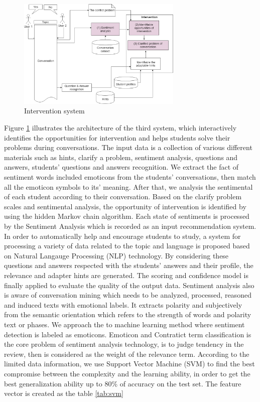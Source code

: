 \documentclass[letterpaper%
, twoside%
, 12pt%
,these%
, english%
,creativecommons,hyperref, withAlgo2e %
]{thETS}
\begin{document}
\begin{figure}
	\includegraphics[width=0.7\textwidth]{Figures/58.png}
	\caption{Intervention system}
	\label{intervention}
\end{figure}
Figure \ref{intervention} illustrates the architecture of the third system, which interactively identifies the opportunities for intervention and helps students solve their problems during conversations. The input data is a collection of various different materials such as hints, clarify a problem, sentiment analysis, questions and answers, students' questions and answers recognition.  We extract the fact of sentiment words included emoticons from the students' conversations, then match all the emoticon symbols to its' meaning. After that, we analysis the sentimental of each student according to their conversation. Based on the clarify problem scales and sentimental analysis, the opportunity of intervention is identified by using the hidden Markov chain algorithm. Each state of sentiments is processed by the Sentiment Analysis which is recorded as an input recommendation system. In order to automatically help and encourage students to study, a system for processing a variety of data related to the topic and language is proposed based on Natural Langauge Processing (NLP) technology.  By considering these questions and answers respected with the students’ answers and their profile, the relevance and adapter hints are generated. The scoring and confidence model is finally applied to evaluate the quality of the output data.  Sentiment  analysis also  is aware of conversation mining which needs to be analyzed,  processed, reasoned and induced texts with emotional labels. It extracts polarity and subjectively from the semantic orientation which refers to the strength of words and polarity text or phases. We approach the to machine learning method where sentiment detection is labeled as emoticons.  Emoticon and Contratict term classification is the core problem of sentiment analysis technology, is to judge tendency in the  review, then is considered as the weight of the relevance term. According to the limited data information, we use Support Vector Machine (SVM) \cite{Saif} to find the best compromise between the complexity and the learning ability, in order to get the best generalization ability up to 80\% of accuracy on the test set. The feature vector is created as the table \ref{tab:svm}
\end{document}
